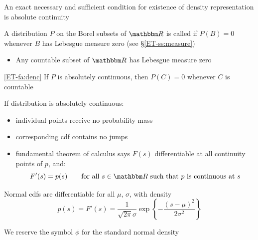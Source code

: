 \begin{frame}

    \vspace{2em}
    An exact necessary and
    sufficient condition for existence of density representation is absolute continuity
    
    \vspace{.7em}
    A
    distribution $P$ on the Borel subsets of $\RR$ is called  if $P(B) = 0$ whenever $B$ has Lebesgue measure zero (see \S\ref{ET-ss:measure})
    \begin{itemize}
        \item Any countable subset of $\RR$ has Lebesgue measure zero
    \end{itemize}
    
    \vspace{2em}
    \Fact\eqref{ET-fa:denc}
        If $P$ is absolutely continuous, then $P(C) = 0$ whenever $C$ is
        countable
        
\end{frame}

\begin{frame}

    \vspace{2em}
    If distribution is absolutely continuous:
    
    \begin{itemize}
        \item individual points
    receive no probability mass 
        \item corresponding {\sc cdf} contains no jumps
        \item fundamental theorem of calculus says $F(s)$
        differentiable at all continuity points of $p$, and:
        \begin{equation*}
            F'(s) = p(s)
            \qquad \text{for all } s \in \RR \text{ such that $p$  is continuous at $s$}
        \end{equation*}
    \end{itemize}
    
\end{frame}

\begin{frame}

    \vspace{2em}
    \Eg
    Normal {\sc cdf}s  are differentiable for all
    $\mu$, $\sigma$, with density
    \begin{equation*}
        p(s) = F'(s) = 
        \frac{1}{\sqrt{2 \pi} \sigma}
           \exp \left\{ - 
               \frac{(s - \mu)^2}{2\sigma^2} \right\} 
    \end{equation*}
    
    \vspace{.7em}
    We reserve the symbol $\phi$ for the
    standard normal density
    
\end{frame}

